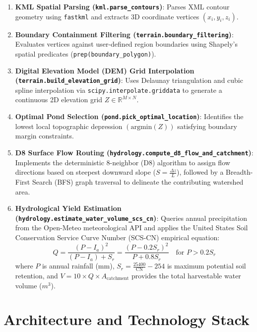 \documentclass[11pt,a4paper]{article}
\begin{document}
\begin{enumerate}[leftmargin=*]
    \item \textbf{KML Spatial Parsing (\texttt{kml.parse\_contours})}: Parses XML contour geometry using \texttt{fastkml} and extracts 3D coordinate vertices $(x_i, y_i, z_i)$.
    \item \textbf{Boundary Containment Filtering (\texttt{terrain.boundary\_filtering})}: Evaluates vertices against user-defined region boundaries using Shapely's spatial predicates (\texttt{prep(boundary\_polygon)}).
    \item \textbf{Digital Elevation Model (DEM) Grid Interpolation (\texttt{terrain.build\_elevation\_grid})}: Uses Delaunay triangulation and cubic spline interpolation via \texttt{scipy.interpolate.griddata} to generate a continuous 2D elevation grid $Z \in \mathbb{R}^{M \times N}$.
    \item \textbf{Optimal Pond Selection (\texttt{pond.pick\_optimal\_location})}: Identifies the lowest local topographic depression $(\text{argmin}(Z))$ satisfying boundary margin constraints.
    \item \textbf{D8 Surface Flow Routing (\texttt{hydrology.compute\_d8\_flow\_and\_catchment})}: Implements the deterministic 8-neighbor (D8) algorithm to assign flow directions based on steepest downward slope ($S = \frac{\Delta z}{L}$), followed by a Breadth-First Search (BFS) graph traversal to delineate the contributing watershed area.
    \item \textbf{Hydrological Yield Estimation (\texttt{hydrology.estimate\_water\_volume\_scs\_cn})}: Queries annual precipitation from the Open-Meteo meteorological API and applies the United States Soil Conservation Service Curve Number (SCS-CN) empirical equation:
    \begin{equation}
        Q = \frac{(P - I_a)^2}{(P - I_a) + S_r} = \frac{(P - 0.2 S_r)^2}{P + 0.8 S_r} \quad \text{for } P > 0.2 S_r
    \end{equation}
    where $P$ is annual rainfall (mm), $S_r = \frac{25400}{\text{CN}} - 254$ is maximum potential soil retention, and $V = 10 \times Q \times A_{\text{catchment}}$ provides the total harvestable water volume ($m^3$).
\end{enumerate}

\section{Architecture and Technology Stack}
\end{document}
